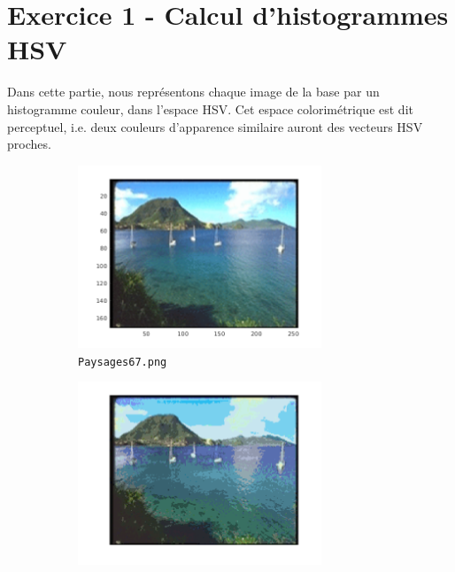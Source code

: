 \documentclass[a4paper]{article}
\begin{document}
\section*{Exercice 1 - Calcul d'histogrammes HSV}

Dans cette partie, nous représentons chaque image de la base par un histogramme
couleur, dans l’espace HSV.  Cet espace colorimétrique est dit perceptuel, i.e.
deux couleurs d’apparence similaire auront des vecteurs HSV proches.

\begin{figure}[H]
    \centering
     
    \begin{subfigure}[c]{0.46\textwidth}
        \centering
        \includegraphics[width=0.8\textwidth]{images/Paysages67.png}
        \caption{\texttt{Paysages67.png}}
    \end{subfigure}
    \begin{subfigure}[c]{0.46\textwidth}
        \centering
        \includegraphics[width=0.8\textwidth]{images/Paysages67_quantifie.png}

\end{subfigure}
\end{figure}
\end{document}
